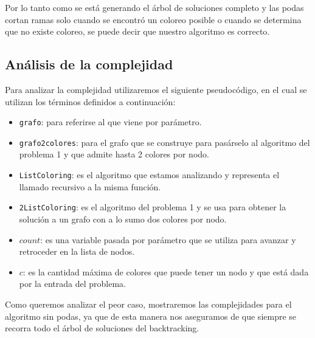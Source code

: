 Por lo tanto como se está generando el árbol de soluciones completo y las podas cortan ramas solo cuando se encontró un coloreo posible o cuando se determina que no existe coloreo, se puede decir que nuestro algoritmo es correcto.

\subsection{Análisis de la complejidad}
\label{sec:complj}

Para analizar la complejidad utilizaremos el siguiente pseudocódigo, en el cual se utilizan los términos definidos a continuación:
\begin{itemize}
	\item \texttt{grafo}: para referirse al que viene por parámetro.
	
	\item \texttt{grafo2colores}: para el grafo que se construye para pasárselo al algoritmo del problema 1 y que admite hasta 2 colores por nodo.
	
	\item \texttt{ListColoring}: es el algoritmo que estamos analizando y representa el llamado recursivo a la misma función. 
	
	\item \texttt{2ListColoring}: es el algoritmo del problema 1 y se usa para obtener la solución a un grafo con a lo sumo dos colores por nodo.
	
	\item $count$: es una variable pasada por parámetro que se utiliza para avanzar y retroceder en la lista de nodos.
	
	\item $c$: es la cantidad máxima de colores que puede tener un nodo y que está dada por la entrada del problema.
\end{itemize}

Como queremos analizar el peor caso, mostraremos las complejidades para el algoritmo sin podas, ya que de esta manera nos aseguramos de que siempre se recorra todo el árbol de soluciones del backtracking.
\newline

